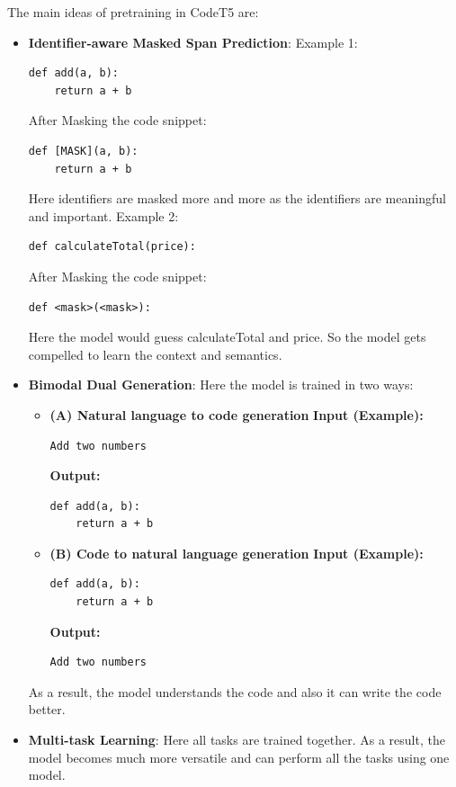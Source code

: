 \documentclass[12pt]{article}
\begin{document}
The main ideas of pretraining in CodeT5 are:
\begin{itemize}
	\item \textbf{Identifier-aware Masked Span Prediction}: Example 1:
	\begin{lstlisting}
def add(a, b):
	return a + b
	\end{lstlisting}
	After Masking the code snippet:
	\begin{lstlisting}
def [MASK](a, b):
	return a + b
	\end{lstlisting}
	Here identifiers are masked more and more as the identifiers are meaningful and important. 
	Example 2:
	\begin{lstlisting}
def calculateTotal(price):
	\end{lstlisting}
	After Masking the code snippet:
	\begin{lstlisting}
def <mask>(<mask>):
	\end{lstlisting}

	Here the model would guess calculateTotal and price. So the model gets compelled to learn the context and semantics.

	\item \textbf{Bimodal Dual Generation}:
	Here the model is trained in two ways:
	\begin{itemize}
		\item \textbf{(A) Natural language to code generation}
		\textbf{Input (Example):}
		\begin{lstlisting}
Add two numbers
		\end{lstlisting}
		\textbf{Output:}
		\begin{lstlisting}
def add(a, b):
    return a + b
		\end{lstlisting}

		\item \textbf{(B) Code to natural language generation}
		\textbf{Input (Example):}
		\begin{lstlisting}
def add(a, b):
    return a + b
		\end{lstlisting}
		\textbf{Output:}
		\begin{lstlisting}
Add two numbers
		\end{lstlisting}
	\end{itemize}
	As a result, the model understands the code and also it can write the code better.
	\item \textbf{Multi-task Learning}:
	Here all tasks are trained together. As a result, the model becomes much more versatile and can perform all the tasks using one model.


\end{itemize}
\end{document}
